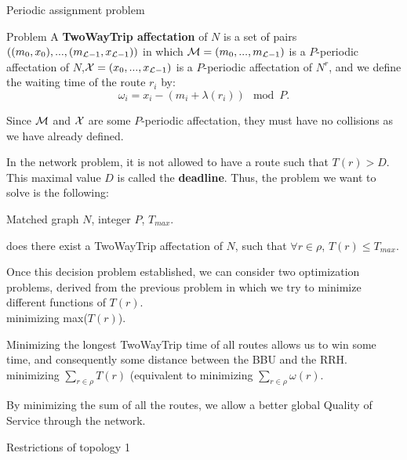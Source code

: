 \documentclass[a4paper,10pt]{report}
\begin{document}
\begin{chapter}{Periodic assignment problem}
\begin{section}{Problem}
A {\bf TwoWayTrip affectation} of $N$ is a set of pairs $ ((m_0,x_0),...,(m_{{\cal L}-1},x_{{\cal L}-1}))$ in which ${\cal M} = (m_0,...,m_{{\cal L}-1})$ 
is a $P$-periodic affectation of $N$,${\cal X} = (x_0,...,x_{{\cal L}-1})$ is a $P$-periodic affectation of $N^r$, and we define the waiting time of the route $r_i$ by:
$$ \omega_i = x_i - (m_i + \lambda(r_i)) \mod P .$$ 

Since ${\cal M}$ and ${\cal X}$ are some $P$-periodic affectation, they must have no collisions as we have already defined.



In the network problem, it is not allowed to have a route such that $T(r) > D$. This maximal value $D$ is called the {\bf deadline}.
Thus, the problem we want to solve is the following:\\


 Matched graph $N$, integer $P$, $ T_{max}$.

 does there exist a TwoWayTrip affectation of $N$, such that $\forall r \in \rho$, $T(r) \le T_{max}$.

Once this decision problem established, we can consider two optimization problems, derived from the previous problem in which
we try to minimize different functions of $T(r)$.\\

 minimizing max($T(r)$).

Minimizing the longest TwoWayTrip time of all routes allows us to win some time, and consequently some distance between the BBU and the RRH.\\

 minimizing $\sum_{r \in \rho}  T(r)$ (equivalent to minimizing $\sum_{r \in \rho}  \omega(r)$.

By minimizing the sum of all the routes, we allow a better global Quality of Service through the network.\\
\begin{subsection}{Restrictions of topology 1}
\label{topologiescases}
\fbox{\parbox{12cm}{
 \begin{figure}[H]
\begin{center}


\end{center}
\end{figure}}}
\end{subsection}
\end{section}
\end{chapter}
\end{document}
